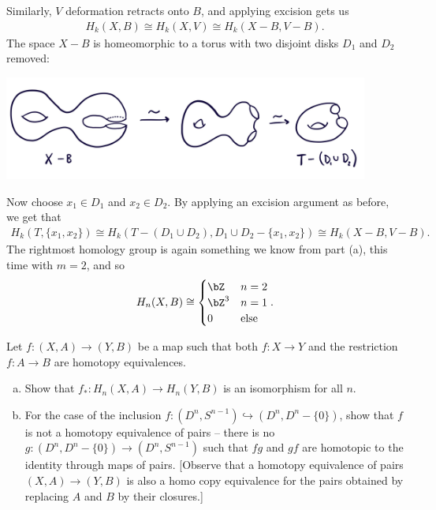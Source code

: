 \begin{homework}[e]
\begin{prf}
\begin{enumerate}[(a)]
      Similarly, $V$ deformation retracts onto $B$, and applying excision gets us
      \begin{align*}
        H_k(X,B) \cong H_k(X,V) \cong H_k(X - B, V - B).
      \end{align*}
      The space $X - B$ is homeomorphic to a torus with two disjoint disks $D_1$ and $D_2$ removed:
    \begin{center}
      \includegraphics[width=12cm]{figures/hwk11-fig2.png}
      \label{fig:prob17-2}
    \end{center}
    Now choose $x_1 \in D_1$ and $x_2 \in D_2$. By applying an excision argument as before, we get that
    \begin{align*}
      H_k(T,\{x_1,x_2\}) \cong H_k(T - (D_1 \cup D_2), D_{1}\cup D_2 - \{x_1,x_2\}) \cong H_k(X - B, V - B).
    \end{align*}
    The rightmost homology group is again something we know from part (a), this time with $m = 2$, and so
    \begin{align*}
      H_n(X,B) \cong
      \begin{cases}
        \bZ & n = 2 \\
        \bZ^{3} & n = 1 \\
        0 & \text{else}
      \end{cases}.
    \end{align*}
    \end{enumerate}
  \end{prf}
   Let $f:(X,A)\to (Y,B)$ be a map such that both $f:X\to Y$ and the restriction $f:A\to B$ are homotopy equivalences.
  \begin{enumerate}[(a)]
    \item Show that $f_*:H_n(X,A)\to H_n(Y,B)$ is an isomorphism for all $n$.
    \item For the case of the inclusion $f:(D^n,S^{n-1}) \hookrightarrow (D^n,D^n - \{0\})$, show that $f$ is not a homotopy equivalence of pairs -- there is no $g:(D^n,D^n - \{0\})\to (D^n,S^{n-1})$ such that $fg $ and $gf$ are homotopic to the identity through maps of pairs. [Observe that a homotopy equivalence of pairs $(X,A) \to (Y,B)$ is also a homo copy equivalence for the pairs obtained by replacing $A$ and $B$ by their closures.]

\end{enumerate}
\end{homework}
